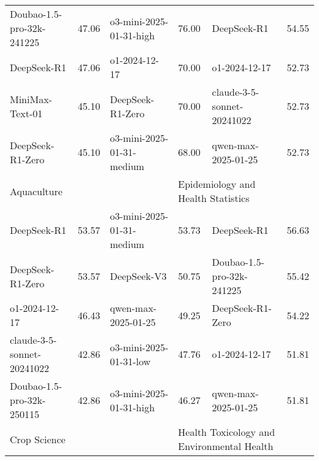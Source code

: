 {\begin{longtable}{p{4.2cm}>{\centering\arraybackslash} p{0.8cm}|p{4.2cm} >{\centering\arraybackslash} p{0.8cm}|p{4.2cm} >{\centering\arraybackslash} p{0.8cm}}
\cellcolor{teal!5} Doubao-1.5-pro-32k-241225 & \cellcolor{teal!2}47.06 & \cellcolor{blue!5} o3-mini-2025-01-31-high & \cellcolor{blue!2} 76.00 & \cellcolor{yellow!5} DeepSeek-R1 & \cellcolor{yellow!2} 54.55\\
\cellcolor{teal!5} DeepSeek-R1 & \cellcolor{teal!2}47.06 & \cellcolor{blue!5} o1-2024-12-17 & \cellcolor{blue!2} 70.00 & \cellcolor{yellow!5} o1-2024-12-17 & \cellcolor{yellow!2} 52.73\\
\cellcolor{teal!5} MiniMax-Text-01 & \cellcolor{teal!2}45.10 & \cellcolor{blue!5} DeepSeek-R1-Zero & \cellcolor{blue!2} 70.00 & \cellcolor{yellow!5} claude-3-5-sonnet-20241022 & \cellcolor{yellow!2} 52.73\\
\cellcolor{teal!5} DeepSeek-R1-Zero & \cellcolor{teal!2}45.10 & \cellcolor{blue!5} o3-mini-2025-01-31-medium & \cellcolor{blue!2} 68.00 & \cellcolor{yellow!5} qwen-max-2025-01-25 & \cellcolor{yellow!2} 52.73\\
\hline
\multicolumn{2}{p{5.15cm}|}{\cellcolor{teal!10} \centering Aquaculture} & \multicolumn{2}{p{5.15cm}|}{\cellcolor{blue!10} \centering Optoelectronic Technology} & \multicolumn{2}{p{5.15cm}}{\cellcolor{yellow!10} \centering Epidemiology and Health Statistics}\\
\hline
\cellcolor{teal!5} DeepSeek-R1 & \cellcolor{teal!2}53.57 & \cellcolor{blue!5} o3-mini-2025-01-31-medium & \cellcolor{blue!2} 53.73 & \cellcolor{yellow!5} DeepSeek-R1 & \cellcolor{yellow!2} 56.63\\
\cellcolor{teal!5} DeepSeek-R1-Zero & \cellcolor{teal!2}53.57 & \cellcolor{blue!5} DeepSeek-V3 & \cellcolor{blue!2} 50.75 & \cellcolor{yellow!5} Doubao-1.5-pro-32k-241225 & \cellcolor{yellow!2} 55.42\\
\cellcolor{teal!5} o1-2024-12-17 & \cellcolor{teal!2}46.43 & \cellcolor{blue!5} qwen-max-2025-01-25 & \cellcolor{blue!2} 49.25 & \cellcolor{yellow!5} DeepSeek-R1-Zero & \cellcolor{yellow!2} 54.22\\
\cellcolor{teal!5} claude-3-5-sonnet-20241022 & \cellcolor{teal!2}42.86 & \cellcolor{blue!5} o3-mini-2025-01-31-low & \cellcolor{blue!2} 47.76 & \cellcolor{yellow!5} o1-2024-12-17 & \cellcolor{yellow!2} 51.81\\
\cellcolor{teal!5} Doubao-1.5-pro-32k-250115 & \cellcolor{teal!2}42.86 & \cellcolor{blue!5} o3-mini-2025-01-31-high & \cellcolor{blue!2} 46.27 & \cellcolor{yellow!5} qwen-max-2025-01-25 & \cellcolor{yellow!2} 51.81\\
\hline
\multicolumn{2}{p{5.15cm}|}{\cellcolor{teal!10} \centering Crop Science} & \multicolumn{2}{p{5.15cm}|}{\cellcolor{blue!10} \centering Theoretical Optics} & \multicolumn{2}{p{5.15cm}}{\cellcolor{yellow!10} \centering Health Toxicology and Environmental Health}\\

\end{longtable}}
